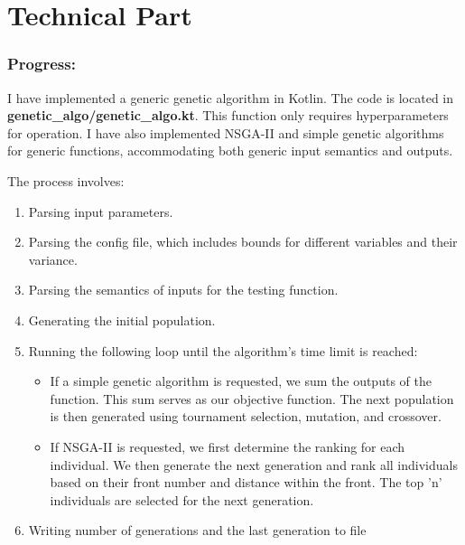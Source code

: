 \documentclass[12pt,letterpaper]{article}
\begin{document}
\section*{Technical Part}
\subsubsection*{Progress:}
I have implemented a generic genetic algorithm in Kotlin. The code is located in \textbf{genetic\_algo/genetic\_algo.kt}. This function only requires hyperparameters for operation. I have also implemented NSGA-II and simple genetic algorithms for generic functions, accommodating both generic input semantics and outputs.

The process involves:
\begin{enumerate}
\item Parsing input parameters.
\item Parsing the config file, which includes bounds for different variables and their variance.
\item Parsing the semantics of inputs for the testing function.
\item Generating the initial population.
\item Running the following loop until the algorithm's time limit is reached:
\begin{itemize}
  \item If a simple genetic algorithm is requested, we sum the outputs of the function. This sum serves as our objective function. The next population is then generated using tournament selection, mutation, and crossover.
  \item If NSGA-II is requested, we first determine the ranking for each individual. We then generate the next generation and rank all individuals based on their front number and distance within the front. The top 'n' individuals are selected for the next generation.
\end{itemize}
\item Writing number of generations and the last generation to file
\end{enumerate}
\end{document}

